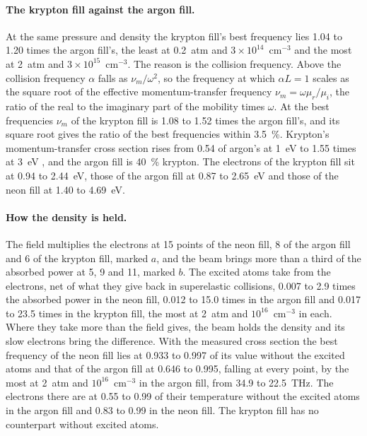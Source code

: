 \documentclass[11pt]{article}
\begin{document}
\paragraph{The krypton fill against the argon fill.}
At the same pressure and density the krypton fill's best frequency lies 1.04 to 1.20 times the argon fill's, the
least at 0.2~atm and $3\times10^{14}$~cm$^{-3}$ and the most at 2~atm and $3\times10^{15}$~cm$^{-3}$. The reason
is the collision frequency. Above the collision frequency $\alpha$ falls as $\nu_m/\omega^2$, so the frequency at
which $\alpha L=1$ scales as the square root of the effective momentum-transfer frequency
$\nu_m=\omega\mu_r/\mu_i$, the ratio of the real to the imaginary part of the mobility times $\omega$. At the best
frequencies $\nu_m$ of the krypton fill is 1.08 to 1.52 times the argon fill's, and its square root gives the ratio
of the best frequencies within 3.5~\%. Krypton's momentum-transfer cross section rises from 0.54 of argon's at
1~eV to 1.55 times at 3~eV \cite{LXCat}, and the argon fill is 40~\% krypton. The electrons of the krypton fill sit
at 0.94 to 2.44~eV, those of the argon fill at 0.87 to 2.65~eV and those of the neon fill at 1.40 to 4.69~eV.

\paragraph{How the density is held.}
The field multiplies the electrons at 15 points of the neon fill, 8 of the argon fill and 6 of the krypton fill,
marked $a$, and the beam brings more than a third of the absorbed power at 5, 9 and 11, marked $b$. The excited
atoms take from the electrons, net of what they give back in superelastic collisions, 0.007 to 2.9 times the
absorbed power in the neon fill, 0.012 to 15.0 times in the argon fill and 0.017 to 23.5 times in the krypton fill,
the most at 2~atm and $10^{16}$~cm$^{-3}$ in each. Where they take more than the field gives, the beam holds the
density and its slow electrons bring the difference. With the measured cross section the best frequency of the
neon fill lies at 0.933 to 0.997 of its value without the excited atoms and that of the argon fill at 0.646 to
0.995, falling at every point, by the most at 2~atm and $10^{16}$~cm$^{-3}$ in the argon fill, from 34.9 to
22.5~THz. The electrons there are at 0.55 to 0.99 of their temperature without the excited atoms in the argon fill
and 0.83 to 0.99 in the neon fill. The krypton fill has no counterpart without excited atoms.

\end{document}
